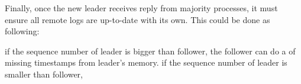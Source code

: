 Finally, once the new leader receives reply from majority processes, it must
ensure all remote logs are up-to-date with its own. This could be done as
following:

if the sequence number of leader is bigger than follower, the follower can do a
\rread of missing timestamps from leader's memory.
if the sequence number of leader is smaller than follower,

